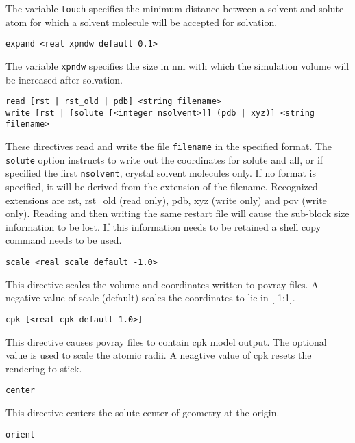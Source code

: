 The variable \verb+touch+ specifies the minimum distance between a solvent 
and solute atom for which a solvent molecule will be accepted for solvation.

\begin{verbatim}
expand <real xpndw default 0.1>
\end{verbatim}

The variable \verb+xpndw+ specifies the size in nm with which the simulation
volume will be increased after solvation.

\begin{verbatim}
read [rst | rst_old | pdb] <string filename>
write [rst | [solute [<integer nsolvent>]] (pdb | xyz)] <string filename>
\end{verbatim}

These directives read and write the file \verb+filename+ in the specified
format. The \verb+solute+ option instructs to write out the coordinates
for solute and all, or if specified the first \verb+nsolvent+, crystal solvent 
molecules only.
If no format is specified, it will be derived from the extension of the
filename. Recognized extensions are rst, rst\_old (read only), pdb, xyz
(write only) and pov (write only).
Reading and then writing the same restart file will cause the
sub-block size information to be lost. If this information needs to be
retained a shell copy command needs to be used.

\begin{verbatim}
scale <real scale default -1.0>
\end{verbatim}

This directive scales the volume and coordinates written to povray files.
A negative value of scale (default) scales the coordinates to lie
in [-1:1].

\begin{verbatim}
cpk [<real cpk default 1.0>]
\end{verbatim}

This directive causes povray files to contain cpk model output. The
optional value is used to scale the atomic radii. A neagtive value
of cpk resets the rendering to stick.

\begin{verbatim}
center
\end{verbatim}

This directive centers the solute center of geometry at the origin.

\begin{verbatim}
orient
\end{verbatim}

